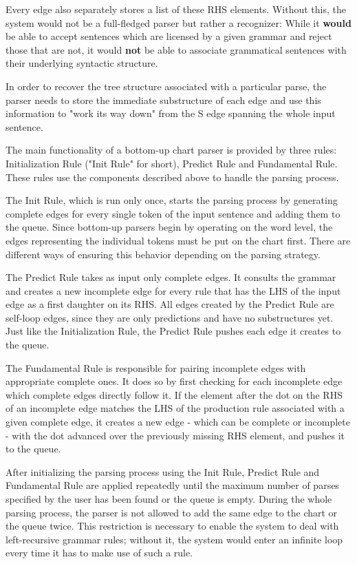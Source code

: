 \documentclass[11pt, titlepage, a4paper]{scrartcl}		%
\begin{document}
Every edge also separately stores a list of these RHS elements. Without this, the system would not be a full-fledged parser but rather a recognizer: While it \textbf{would} be able to accept sentences which are licensed by a given grammar and reject those that are not, it would \textbf{not} be able to associate grammatical sentences with their underlying syntactic structure.

In order to recover the tree structure associated with a particular parse, the parser needs to store the immediate substructure of each edge and use this information to "work its way down" from the S edge spanning the whole input sentence.

The main functionality of a bottom-up chart parser is provided by three rules: Initialization Rule ("Init Rule" for short), Predict Rule and Fundamental Rule. These rules use the components described above to handle the parsing process.

The Init Rule, which is run only once, starts the parsing process by generating complete edges for every single token of the input sentence and adding them to the queue. Since bottom-up parsers begin by operating on the word level, the edges representing the individual tokens must be put on the chart first. There are different ways of ensuring this behavior depending on the parsing strategy.

The Predict Rule takes as input only complete edges. It consults the grammar and creates a new incomplete edge for every rule that has the LHS of the input edge as a first daughter on its RHS. All edges created by the Predict Rule are self-loop edges, since they are only predictions and have no substructures yet. Just like the Initialization Rule, the Predict Rule pushes each edge it creates to the queue.

The Fundamental Rule is responsible for pairing incomplete edges with appropriate complete ones. It does so by first checking for each incomplete edge which complete edges directly follow it. If the element after the dot on the RHS of an incomplete edge matches the LHS of the production rule associated with a given complete edge, it creates a new edge - which can be complete or incomplete - with the dot advanced over the previously missing RHS element, and pushes it to the queue.

After initializing the parsing process using the Init Rule, Predict Rule and Fundamental Rule are applied repeatedly until the maximum number of parses specified by the user has been found or the queue is empty. During the whole parsing process, the parser is not allowed to add the same edge to the chart or the queue twice. This restriction is necessary to enable the system to deal with left-recursive grammar rules; without it, the system would enter an infinite loop every time it has to make use of such a rule.
\end{document}
